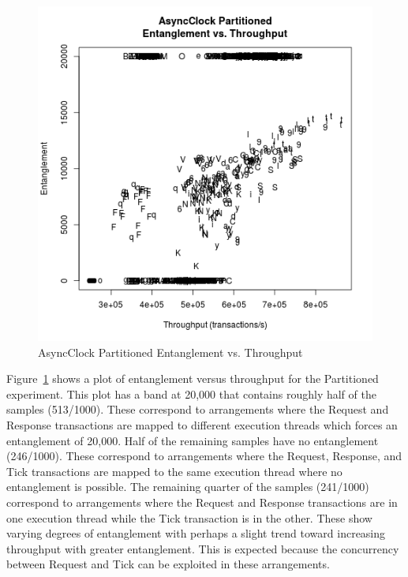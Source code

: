 \begin{figure}[H]
\center
\includegraphics[height=.4\textheight]{async_partitioned_throughput_entanglement.png}
\caption{AsyncClock Partitioned Entanglement vs. Throughput}
\label{async_partitioned_throughput_entanglement}
\end{figure}

Figure~\ref{async_partitioned_throughput_entanglement} shows a plot of entanglement versus throughput for the Partitioned experiment.
This plot has a band at 20,000 that contains roughly half of the samples (513/1000).
These correspond to arrangements where the Request and Response transactions are mapped to different execution threads which forces an entanglement of 20,000.
Half of the remaining samples have no entanglement (246/1000).
These correspond to arrangements where the Request, Response, and Tick transactions are mapped to the same execution thread where no entanglement is possible.
The remaining quarter of the samples (241/1000) correspond to arrangements where the Request and Response transactions are in one execution thread while the Tick transaction is in the other.
These show varying degrees of entanglement with perhaps a slight trend toward increasing throughput with greater entanglement.
This is expected because the concurrency between Request and Tick can be exploited in these arrangements.

